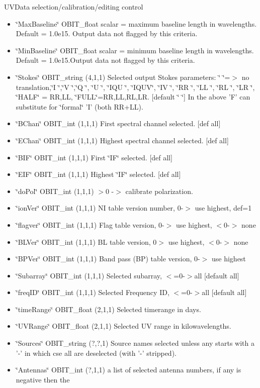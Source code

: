 UVData selection/calibration/editing control \begin{itemize}
\item \char`\"{}Max\-Baseline\char`\"{} OBIT\_\-float scalar = maximum baseline length in wavelengths. Default = 1.0e15. Output data not flagged by this criteria. \item \char`\"{}Min\-Baseline\char`\"{} OBIT\_\-float scalar = minimum baseline length in wavelengths. Default = 1.0e15.Output data not flagged by this criteria. \item \char`\"{}Stokes\char`\"{} OBIT\_\-string (4,1,1) Selected output Stokes parameters: \char`\"{}    \char`\"{}=$>$ no translation,\char`\"{}I   \char`\"{},\char`\"{}V   \char`\"{},\char`\"{}Q   \char`\"{}, \char`\"{}U   \char`\"{}, \char`\"{}IQU \char`\"{}, \char`\"{}IQUV\char`\"{}, \char`\"{}IV  \char`\"{}, \char`\"{}RR  \char`\"{}, \char`\"{}LL  \char`\"{}, \char`\"{}RL  \char`\"{}, \char`\"{}LR  \char`\"{}, \char`\"{}HALF\char`\"{} = RR,LL, \char`\"{}FULL\char`\"{}=RR,LL,RL,LR. [default \char`\"{}    \char`\"{}] In the above 'F' can substitute for \char`\"{}formal\char`\"{} 'I' (both RR+LL). \item \char`\"{}BChan\char`\"{} OBIT\_\-int (1,1,1) First spectral channel selected. [def all] \item \char`\"{}EChan\char`\"{} OBIT\_\-int (1,1,1) Highest spectral channel selected. [def all] \item \char`\"{}BIF\char`\"{} OBIT\_\-int (1,1,1) First \char`\"{}IF\char`\"{} selected. [def all] \item \char`\"{}EIF\char`\"{} OBIT\_\-int (1,1,1) Highest \char`\"{}IF\char`\"{} selected. [def all] \item \char`\"{}do\-Pol\char`\"{} OBIT\_\-int (1,1,1) $>$0 -$>$ calibrate polarization. \item \char`\"{}ion\-Ver\char`\"{} OBIT\_\-int (1,1,1) NI table version number, 0-$>$ use highest, def=1 \item \char`\"{}flagver\char`\"{} OBIT\_\-int (1,1,1) Flag table version, 0-$>$ use highest, $<$0-$>$ none \item \char`\"{}BLVer\char`\"{} OBIT\_\-int (1,1,1) BL table version, 0$>$ use highest, $<$0-$>$ none \item \char`\"{}BPVer\char`\"{} OBIT\_\-int (1,1,1) Band pass (BP) table version, 0-$>$ use highest \item \char`\"{}Subarray\char`\"{} OBIT\_\-int (1,1,1) Selected subarray, $<$=0-$>$all [default all] \item \char`\"{}freq\-ID\char`\"{} OBIT\_\-int (1,1,1) Selected Frequency ID, $<$=0-$>$all [default all] \item \char`\"{}time\-Range\char`\"{} OBIT\_\-float (2,1,1) Selected timerange in days. \item \char`\"{}UVRange\char`\"{} OBIT\_\-float (2,1,1) Selected UV range in kilowavelengths. \item \char`\"{}Sources\char`\"{} OBIT\_\-string (?,?,1) Source names selected unless any starts with a '-' in which cse all are deselected (with '-' stripped). \item \char`\"{}Antennas\char`\"{} OBIT\_\-int (?,1,1) a list of selected antenna numbers, if any is negative then the 
\end{itemize}
